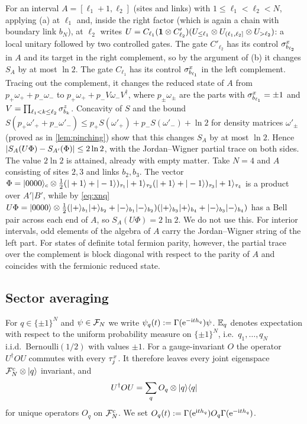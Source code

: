 \begin{remark}\label{rem:interior}
For an interval $A=[\ell_1+1,\ell_2]$ (sites and links) with $1\le\ell_1<\ell_2<N$, applying (a) at
$\ell_1$ and, inside the right factor (which is again a chain with boundary link $b_N$), at $\ell_2$ writes
$U=C_{\ell_1}(\mathbf{1}\otimes C'_{\ell_2})(U_{\le\ell_1}\otimes U_{(\ell_1,\ell_2]}\otimes U_{>\ell_2})$: a local unitary
followed by two controlled gates.  The gate $C'_{\ell_2}$ has its control $\sigma^{x}_{b_{\ell_2}}$ in $A$ and its
target in the right complement, so by the argument of (b) it changes $S_A$ by at most $\ln2$.  The gate
$C_{\ell_1}$ has its control $\sigma^{x}_{b_{\ell_1}}$ in the left complement.  Tracing out the complement, it changes the
reduced state of $A$ from $p_+\omega_++p_-\omega_-$ to $p_+\omega_++p_-V\omega_-V^\dagger$, where
$p_\pm\omega_\pm$ are the parts with $\sigma^{x}_{b_{\ell_1}}=\pm1$ and $V=\prod_{\ell_1<k\le\ell_2}\sigma^{z}_{b_{k}}$.  Concavity of
$S$ and the bound $S(p_+\omega'_++p_-\omega'_-)\le p_+S(\omega'_+)+p_-S(\omega'_-)+\ln2$ for density matrices
$\omega'_\pm$ (proved as in \cref{lem:pinching}) show that this changes $S_A$ by at most $\ln2$.  Hence
$\left|S_A(U\Phi)-S_{A'}(\Phi)\right|\le2\ln2$, with the Jordan--Wigner partial trace on both sides.  The value
$2\ln2$ is attained, already with empty matter.  Take $N=4$ and $A$ consisting of sites $2,3$ and links $b_2,b_3$.  The vector
$\Phi=|0000\rangle_c\otimes\frac12(|+1\rangle+|-1\rangle)_{\tau_1}|+1\rangle_{\tau_2}(|+1\rangle+|-1\rangle)_{\tau_3}|+1\rangle_{\tau_4}$
is a product over $A'|B'$, while by \eqref{eq:xnq}
$U\Phi=|0000\rangle\otimes\frac12(|+\rangle_{b_1}|+\rangle_{b_2}+|-\rangle_{b_1}|-\rangle_{b_2})(|+\rangle_{b_3}|+\rangle_{b_4}+|-\rangle_{b_3}|-\rangle_{b_4})$
has a Bell pair across each end of $A$, so $S_A(U\Phi)=2\ln2$.  We do not use this.
For interior intervals, odd elements of the algebra of $A$ carry the Jordan--Wigner string of the
left part.  For states of definite total fermion parity, however, the partial trace over the
complement is block diagonal with respect to the parity of $A$ and coincides with the fermionic
reduced state.
\end{remark}

\subsection{Sector averaging}\label{sec:model:sector}

For $q\in\{\pm1\}^N$ and $\psi\in\mathcal{F}_N$ we write $\psi_q(t):=\Gamma(\mathrm{e}^{-\mathrm{i} th_{q}})\psi$.  $\mathbb{E}_q$
denotes expectation with respect to the uniform probability measure on $\{\pm1\}^N$, i.e.\ $q_1,\dots,q_N$
i.i.d.\ Bernoulli$(1/2)$ with values $\pm1$.  For a gauge-invariant $O$ the operator $U^\dagger OU$
commutes with every $\tau^{x}_{j}$.  It therefore leaves every joint eigenspace $\mathcal{F}^c_N\otimes|q\rangle$
invariant, and
\begin{equation}\label{eq:Oq}
  U^\dagger OU=\sum_qO_q\otimes|q\rangle\langle q|
\end{equation}
for unique operators $O_q$ on $\mathcal{F}^c_N$.  We set $O_q(t):=\Gamma(\mathrm{e}^{\mathrm{i} th_{q}})O_q\Gamma(\mathrm{e}^{-\mathrm{i} th_{q}})$.

